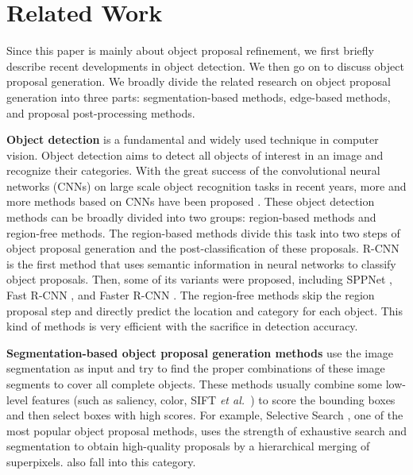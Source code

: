 \documentclass[letterpaper]{article} %
\newcommand{\myPara}[1]{\vspace{.1in}\textbf{#1}}
\def\etal{{\em et al.~}}
\begin{document}
\section{Related Work}
%
Since this paper is mainly about object proposal refinement,
we first briefly describe recent developments in object detection.
We then go on to discuss object proposal generation.
We broadly divide the related research on object proposal generation
into three parts: segmentation-based methods,
edge-based methods, and proposal post-processing methods.


\myPara{Object detection} is a fundamental and widely used technique
in computer vision.
Object detection aims to detect all objects of interest in an image
and recognize their categories.
%
With the great success of the convolutional neural networks (CNNs) on large
scale object recognition tasks in recent years, more and more methods based
on CNNs have been proposed \cite{girshick2014rich,girshick2015fast}.
These object detection methods can be broadly divided into two groups:
region-based methods and region-free methods.
%
The region-based methods divide this task into two steps of object proposal
generation and the post-classification of these proposals.
R-CNN \cite{girshick2014rich} is the first method that uses semantic information
in neural networks to classify object proposals.
Then, some of its variants were proposed, including
SPPNet \cite{he2014spatial}, Fast R-CNN \cite{girshick2015fast},
and Faster R-CNN \cite{ren2015faster}.
%
The region-free methods \cite{liu2016ssd,redmon2016you,redmon2016yolo9000}
skip the region proposal step and directly predict the location and category
for each object.
This kind of methods is very efficient with the sacrifice in detection accuracy.


\myPara{Segmentation-based object proposal generation methods}
use the image segmentation as input and try to find the proper combinations
of these image segments to cover all complete objects.
These methods usually combine some low-level features (such as saliency, color,
SIFT \etal) to score the bounding boxes and then select boxes with high scores.
%
For example, Selective Search \cite{uijlings2013selective}, one of the most popular
object proposal methods, uses the strength of exhaustive search and segmentation to
obtain high-quality proposals by a hierarchical merging of superpixels.
%
\cite{arbelaez2014multiscale,rahtu2011learning,endres2014category,manen2013prime,rantalankila2014generating,krahenbuhl2015learning} also fall into this category.
\end{document}
